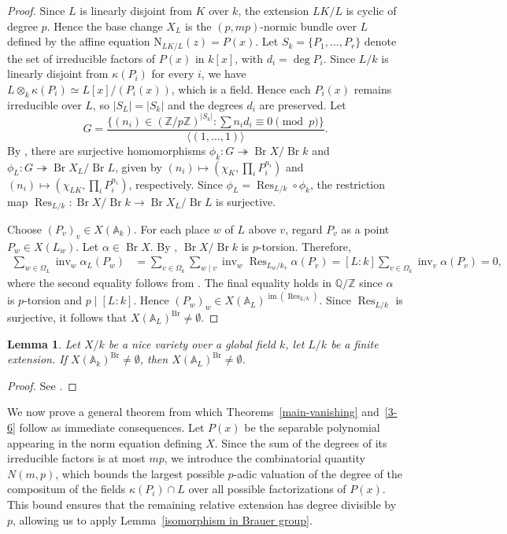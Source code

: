 \documentclass[10pt]{amsart}
\theoremstyle{plain}
\newtheorem{lemma}[thm]{Lemma}
\theoremstyle{definition}
\newcommand{\A}{{\mathbb A}}
\newcommand{\Q}{{\mathbb Q}}
\newcommand{\Z}{{\mathbb Z}}
\newcommand{\Nm}{\mathrm{N}}
\newcommand{\Br}{\operatorname{Br}}
\newcommand{\res}{\operatorname{Res}}
\newcommand{\inv}{\operatorname{inv}}
\begin{document}
\begin{proof}
Since \(L\) is linearly disjoint from \(K\) over \(k\), the extension \(LK/L\) is cyclic of degree \(p\). Hence the base change \(X_L\) is the \((p,mp)\)-normic bundle over \(L\) defined by the affine equation \(\Nm_{LK/L}(z)=P(x)\). Let $S_k=\{P_1,\dots,P_r\}$ denote the set of irreducible factors of $P(x)$ in $k[x]$, with $d_i=\deg P_i$. Since $L/k$ is linearly disjoint from $\kappa(P_i)$ for every $i$, we have $L\otimes_k\kappa(P_i)\simeq L[x]/(P_i(x))$, which is a field. Hence each $P_i(x)$ remains irreducible over $L$, so $|S_L|=|S_k|$ and the degrees $d_i$ are preserved. Let
$$
G=\frac{\{(n_i)\in(\mathbb Z/p\mathbb Z)^{|S_k|}:\sum n_i d_i\equiv0\pmod p\}}{\langle(1,\dots,1)\rangle}.
$$
By \cite[Theorem~3.2]{AVB}, there are surjective homomorphisms $\phi_k:G\twoheadrightarrow\Br X/\Br k$ and $\phi_L:G\twoheadrightarrow\Br X_L/\Br L$, given by $(n_i)\mapsto(\chi_K,\prod_iP_i^{n_i})$ and $(n_i)\mapsto(\chi_{LK},\prod_iP_i^{n_i})$, respectively. Since $\phi_L=\res_{L/k}\circ\phi_k$, the restriction map $\res_{L/k}:\Br X/\Br k\to\Br X_L/\Br L$ is surjective.

Choose $(P_v)_v\in X(\A_k)$. For each place $w$ of $L$ above $v$, regard $P_v$ as a point $P_w\in X(L_w)$. Let $\alpha\in\Br X$. By \cite[Theorem~3.2]{AVB}, $\Br X/\Br k$ is $p$-torsion. Therefore,  
$$
\begin{aligned}
\sum_{w\in\Omega_L}\inv_w\alpha_L(P_w)
&=\sum_{v\in\Omega_k}\sum_{w\mid v}\inv_w\res_{L_w/k_v}\alpha(P_v)=[L:k]\sum_{v\in\Omega_k}\inv_v\alpha(P_v)=0,
\end{aligned}
$$
where the second equality follows from \cite[Theorem~1.5.34]{Poo}. The final equality holds in \(\Q/\Z\) since \(\alpha\) is \(p\)-torsion and \(p\mid[L:k]\). Hence $(P_w)_w\in X(\A_L)^{\operatorname{im}(\res_{L/k})}$. Since $\res_{L/k}$ is surjective, it follows that $X(\A_L)^{\Br}\neq\emptyset$.
\end{proof}

\begin{lemma}\label{points below to points above}
Let $X/k$ be a nice variety over a global field $k$, let $L/k$ be a finite extension. If $X(\A_k)^{\Br}\neq\emptyset$, then $X(\A_L)^{\Br}\neq\emptyset$.
\end{lemma}

\begin{proof}
See \cite[Lemma 3.1]{CV}.
\end{proof}

We now prove a general theorem from which Theorems~\ref{main-vanishing} and~\ref{3-6} follow as immediate consequences. Let \(P(x)\) be the separable polynomial appearing in the norm equation defining \(X\). Since the sum of the degrees of its irreducible factors is at most \(mp\), we introduce the combinatorial quantity \(N(m,p)\), which bounds the largest possible \(p\)-adic valuation of the degree of the compositum of the fields \(\kappa(P_i)\cap L\) over all possible factorizations of \(P(x)\). This bound ensures that the remaining relative extension has degree divisible by \(p\), allowing us to apply Lemma~\ref{isomorphism in Brauer group}.
\end{document}
